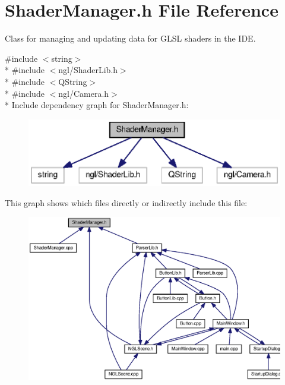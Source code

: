 \section{Shader\-Manager.\-h File Reference}
\label{_shader_manager_8h}


Class for managing and updating data for G\-L\-S\-L shaders in the I\-D\-E.  


{\ttfamily \#include $<$string$>$}\\*
{\ttfamily \#include $<$ngl/\-Shader\-Lib.\-h$>$}\\*
{\ttfamily \#include $<$Q\-String$>$}\\*
{\ttfamily \#include $<$ngl/\-Camera.\-h$>$}\\*
Include dependency graph for Shader\-Manager.\-h\-:\nopagebreak
\begin{figure}[H]
\begin{center}
\leavevmode
\includegraphics[width=346pt]{_shader_manager_8h__incl}
\end{center}
\end{figure}
This graph shows which files directly or indirectly include this file\-:\nopagebreak
\begin{figure}[H]
\begin{center}
\leavevmode
\includegraphics[width=350pt]{_shader_manager_8h__dep__incl}
\end{center}
\end{figure}
